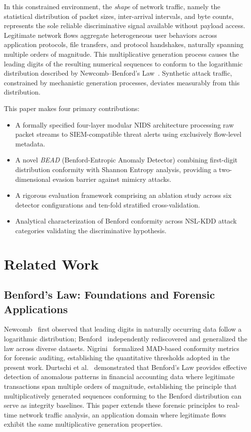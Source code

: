 \documentclass[conference]{IEEEtran}
\begin{document}
In this constrained environment, the \textit{shape} of network traffic,
namely the statistical distribution of packet sizes, inter-arrival intervals,
and byte counts, represents the sole reliable discriminative signal available
without payload access. Legitimate network flows aggregate heterogeneous user
behaviors across application protocols, file transfers, and protocol
handshakes, naturally spanning multiple orders of magnitude. This
multiplicative generation process causes the leading digits of the resulting
numerical sequences to conform to the logarithmic distribution described by
Newcomb--Benford's Law~\cite{b4,b5}. Synthetic attack traffic, constrained
by mechanistic generation processes, deviates measurably from this distribution.

This paper makes four primary contributions:
\begin{itemize}
  \item A formally specified four-layer modular NIDS architecture processing
        raw packet streams to SIEM-compatible threat alerts using exclusively
        flow-level metadata.
  \item A novel \textit{BEAD} (Benford-Entropic Anomaly Detector) combining
        first-digit distribution conformity with Shannon Entropy analysis,
        providing a two-dimensional evasion barrier against mimicry attacks.
  \item A rigorous evaluation framework comprising an ablation study across
        six detector configurations and ten-fold stratified cross-validation.
  \item Analytical characterization of Benford conformity across NSL-KDD
        attack categories validating the discriminative hypothesis.
\end{itemize}

\section{Related Work}

\subsection{Benford's Law: Foundations and Forensic Applications}

Newcomb~\cite{b4} first observed that leading digits in naturally occurring
data follow a logarithmic distribution; Benford~\cite{b5} independently
rediscovered and generalized the law across diverse datasets.
Nigrini~\cite{b6} formalized MAD-based conformity metrics for forensic
auditing, establishing the quantitative thresholds adopted in the present
work. Durtschi et al.~\cite{b12} demonstrated that Benford's Law provides
effective detection of anomalous patterns in financial accounting data where
legitimate transactions span multiple orders of magnitude, establishing the
principle that multiplicatively generated sequences conforming to the
Benford distribution can serve as integrity baselines.
This paper extends these forensic principles to real-time network traffic
analysis, an application domain where legitimate flows exhibit the same
multiplicative generation properties.
\end{document}
